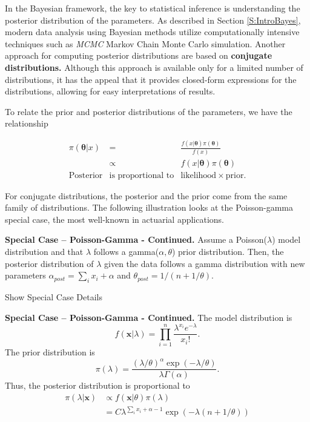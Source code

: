 \documentclass[]{book}
\theoremstyle{definition}
\theoremstyle{definition}
\theoremstyle{definition}
\theoremstyle{remark}
\begin{document}
In the Bayesian framework, the key to statistical inference is
understanding the posterior distribution of the parameters. As described
in Section \ref{S:IntroBayes}, modern data analysis using Bayesian
methods utilize computationally intensive techniques such as
\emph{MCMC}{ Markov Chain Monte Carlo} simulation. Another approach for
computing posterior distributions are based on \textbf{conjugate
distributions.} Although this approach is available only for a limited
number of distributions, it has the appeal that it provides closed-form
expressions for the distributions, allowing for easy interpretations of
results.

To relate the prior and posterior distributions of the parameters, we
have the relationship

\[\begin{array}{ccc}
\pi(\boldsymbol \theta | x) & = & \frac{f(x|\boldsymbol \theta )\pi(\boldsymbol \theta)}{f(x)}  \\
 & \propto  & f(x|\boldsymbol \theta ) \pi(\boldsymbol \theta) \\
\text{Posterior} & \text{is proportional to} & \text{likelihood} \times \text{prior} .
\end{array}\]

For conjugate distributions, the posterior and the prior come from the
same family of distributions. The following illustration looks at the
Poisson-gamma special case, the most well-known in actuarial
applications.

\textbf{Special Case -- Poisson-Gamma - Continued.} Assume a
Poisson(\(\lambda\)) model distribution and that \(\lambda\) follows a
gamma(\(\alpha, \theta\)) prior distribution. Then, the posterior
distribution of \(\lambda\) given the data follows a gamma distribution
with new parameters \(\alpha_{post} = \sum_i x_i + \alpha\) and
\(\theta_{post} = 1/(n + 1/\theta)\).

Show Special Case Details

\hypertarget{toggleExampleConj}{}
\textbf{Special Case -- Poisson-Gamma - Continued.} The model
distribution is
\[f(\mathbf{x} | \lambda) = \prod_{i=1}^n \frac{\lambda^{x_i} e^{-\lambda}}{x_i!} .\]
The prior distribution is
\[\pi(\lambda) = \frac{\left(\lambda/\theta\right)^{\alpha} \exp(-\lambda/\theta)}{\lambda \Gamma(\alpha)}.\]
Thus, the posterior distribution is proportional to \[\begin{aligned}
\pi(\lambda | \mathbf{x}) &\propto f(\mathbf{x}|\theta ) \pi(\lambda) \\
&= C \lambda^{\sum_i x_i + \alpha -1} \exp(-\lambda(n+1/\theta))
\end{aligned}\]
\end{document}
